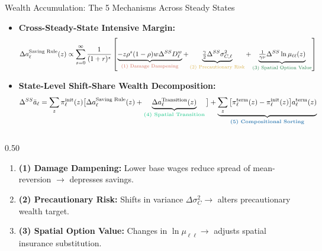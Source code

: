 \documentclass[aspectratio=169, 10pt]{beamer}
\begin{document}
\begin{frame}{Wealth Accumulation: The 5 Mechanisms Across Steady States}\label{main:mechanisms}
    \begin{itemize}\footnotesize\setlength{\itemsep}{1pt}
        \item \textbf{Cross-Steady-State Intensive Margin:}
        \begin{equation}
        \Delta a_\ell^{\text{Saving Rule}}(z) \propto \sum_{s=0}^{\infty} \frac{1}{(1+r)^s} \left[ \underbrace{- z \rho^s (1-\rho) w \Delta^{SS} D^w_\ell}_{\text{\textcolor{terracotta}{(1) Damage Dampening}}} + \underbrace{\tfrac{\gamma}{2} \Delta^{SS} \sigma_{C, \ell}^2}_{\text{\textcolor{mutedgold}{(2) Precautionary Risk}}} + \underbrace{\tfrac{1}{\gamma \nu} \Delta^{SS} \ln \mu_{\ell \ell}(z)}_{\text{\textcolor{emerald}{(3) Spatial Option Value}}} \right]
        \label{eq:intensive_margin}
        \end{equation}
        \item \textbf{State-Level Shift-Share Wealth Decomposition:}
        \begin{equation}
        \Delta^{SS} \bar{a}_\ell = \sum_z \pi_\ell^{\text{init}}(z) \big[\Delta a_\ell^{\text{Saving Rule}}(z) + \underbrace{\Delta a_\ell^{\text{Transition}}(z)}_{\text{\textcolor{lightemerald}{\textbf{(4) Spatial Transition}}}}\big] + \underbrace{\sum_z \big[\pi_\ell^{\text{term}}(z) - \pi_\ell^{\text{init}}(z) \big] a_\ell^{\text{term}}(z)}_{\text{\textcolor{cobaltblue}{\textbf{(5) Compositional Sorting}}}}
        \label{eq:shift_share}
        \end{equation}
    \end{itemize}
    \vspace{0.04cm}
    \begin{tcolorbox}[leafbox, title=Recap of the 5 Mechanisms]
        \scriptsize
        \begin{columns}[T]
            \begin{column}{0.50\textwidth}
                \begin{enumerate}\setlength{\itemsep}{0pt}
                    \item \textcolor{terracotta}{\textbf{(1) Damage Dampening:}} Lower base wages reduce spread of mean-reversion $\to$ depresses savings.
                    \item \textcolor{mutedgold}{\textbf{(2) Precautionary Risk:}} Shifts in variance $\Delta \sigma_C^2 \to$ alters precautionary wealth target.
                    \item \textcolor{emerald}{\textbf{(3) Spatial Option Value:}} Changes in $\ln \mu_{\ell\ell} \to$ adjusts spatial insurance substitution.

\end{enumerate}
\end{column}
\end{columns}
\end{tcolorbox}
\end{frame}
\end{document}
